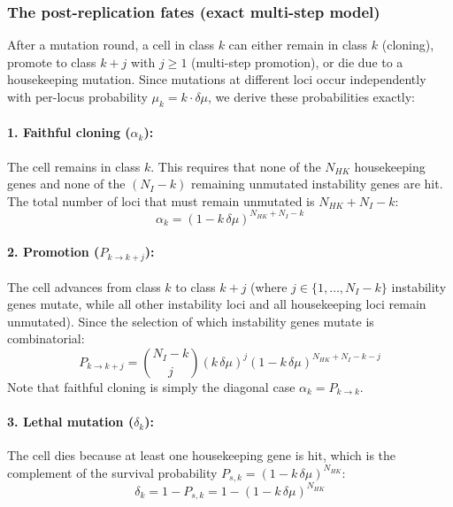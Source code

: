 \documentclass[11pt,a4paper]{article}
\begin{document}
\subsubsection*{The post-replication fates (exact multi-step model)}

After a mutation round, a cell in class $k$ can either remain in class $k$ (cloning), promote to class $k+j$ with $j \ge 1$ (multi-step promotion), or die due to a housekeeping mutation. Since mutations at different loci occur independently with per-locus probability $\mu_k = k \cdot \delta\mu$, we derive these probabilities exactly:

\paragraph{1. Faithful cloning ($\alpha_k$):} The cell remains in class $k$. This requires that none of the $N_{HK}$ housekeeping genes and none of the $(N_I - k)$ remaining unmutated instability genes are hit. The total number of loci that must remain unmutated is $N_{HK} + N_I - k$:
\begin{equation}
    \alpha_k = (1 - k\,\delta\mu)^{N_{HK} + N_I - k}
\end{equation}

\paragraph{2. Promotion ($P_{k \to k+j}$):} The cell advances from class $k$ to class $k+j$ (where $j \in \{1, \dots, N_I - k\}$ instability genes mutate, while all other instability loci and all housekeeping loci remain unmutated). Since the selection of which instability genes mutate is combinatorial:
\begin{equation}
    P_{k \to k+j} = \binom{N_I - k}{j} (k\,\delta\mu)^j (1 - k\,\delta\mu)^{N_{HK} + N_I - k - j}
\end{equation}
Note that faithful cloning is simply the diagonal case $\alpha_k = P_{k \to k}$.

\paragraph{3. Lethal mutation ($\delta_k$):} The cell dies because at least one housekeeping gene is hit, which is the complement of the survival probability $P_{s,k} = (1 - k\,\delta\mu)^{N_{HK}}$:
\begin{equation}
    \delta_k = 1 - P_{s,k} = 1 - (1 - k\,\delta\mu)^{N_{HK}}
\end{equation}
\end{document}
